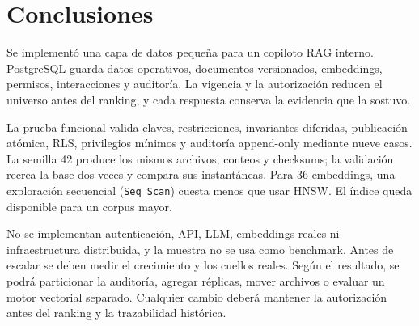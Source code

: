 \section{Conclusiones}

Se implementó una capa de datos pequeña para un copiloto RAG interno. PostgreSQL
guarda datos operativos, documentos versionados, embeddings, permisos,
interacciones y auditoría. La vigencia y la autorización reducen el universo
antes del ranking, y cada respuesta conserva la evidencia que la sostuvo.

La prueba funcional valida claves, restricciones, invariantes diferidas,
publicación atómica, RLS, privilegios mínimos y auditoría append-only mediante
nueve casos. La semilla 42 produce los mismos archivos, conteos y checksums; la
validación recrea la base dos veces y compara sus instantáneas. Para 36
embeddings, una exploración secuencial (\texttt{Seq Scan}) cuesta menos que usar
HNSW. El índice queda disponible para un corpus mayor.

No se implementan autenticación, API, LLM, embeddings reales ni infraestructura
distribuida, y la muestra no se usa como benchmark. Antes de escalar se deben
medir el crecimiento y los cuellos reales. Según el resultado, se podrá
particionar la auditoría, agregar réplicas, mover archivos o evaluar un motor
vectorial separado. Cualquier cambio deberá mantener la autorización antes del
ranking y la trazabilidad histórica.
